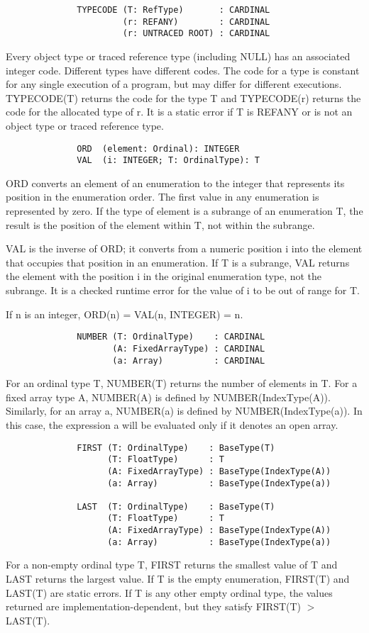 \documentclass[10pt]{article}
\begin{document}
\begin{verbatim}
              TYPECODE (T: RefType)       : CARDINAL
                       (r: REFANY)        : CARDINAL
                       (r: UNTRACED ROOT) : CARDINAL
\end{verbatim}
Every object type or traced reference type (including NULL) has an associated
integer code.  Different types have different codes.  The code for a type is
constant for any single execution of a program, but may differ for different
executions.  TYPECODE(T) returns the code for the type T and TYPECODE(r)
returns the code for the allocated type of r.  It is a static error if T is
REFANY or is not an object type or traced reference type.

\begin{verbatim}
              ORD  (element: Ordinal): INTEGER
              VAL  (i: INTEGER; T: OrdinalType): T
\end{verbatim}
ORD converts an element of an enumeration to the integer that represents its
position in the enumeration order.  The first value in any enumeration is
represented by zero.  If the type of element is a subrange of an enumeration
T, the result is the position of the element within T, not within the
subrange.

VAL is the inverse of ORD; it converts from a numeric position i into the
element that occupies that position in an enumeration.  If T is a subrange,
VAL returns the element with the position i in the original enumeration type,
not the subrange.  It is a checked runtime error for the value of i to be out
of range for T.

If n is an integer, ORD(n) = VAL(n, INTEGER) = n.

\begin{verbatim}
              NUMBER (T: OrdinalType)    : CARDINAL
                     (A: FixedArrayType) : CARDINAL
                     (a: Array)          : CARDINAL
\end{verbatim}
For an ordinal type T, NUMBER(T) returns the number of elements in T.  For a
fixed array type A, NUMBER(A) is defined by NUMBER(IndexType(A)).  Similarly,
for an array a, NUMBER(a) is defined by NUMBER(IndexType(a)).  In this case,
the expression a will be evaluated only if it denotes an open array.

\begin{verbatim}
              FIRST (T: OrdinalType)    : BaseType(T)
                    (T: FloatType)      : T
                    (A: FixedArrayType) : BaseType(IndexType(A))
                    (a: Array)          : BaseType(IndexType(a))

              LAST  (T: OrdinalType)    : BaseType(T)
                    (T: FloatType)      : T
                    (A: FixedArrayType) : BaseType(IndexType(A))
                    (a: Array)          : BaseType(IndexType(a))
\end{verbatim}
For a non-empty ordinal type T, FIRST returns the smallest value of T and LAST
returns the largest value.  If T is the empty enumeration, FIRST(T) and
LAST(T) are static errors.  If T is any other empty ordinal type, the values
returned are implementation-dependent, but they satisfy FIRST(T) $>$ LAST(T).
\end{document}
